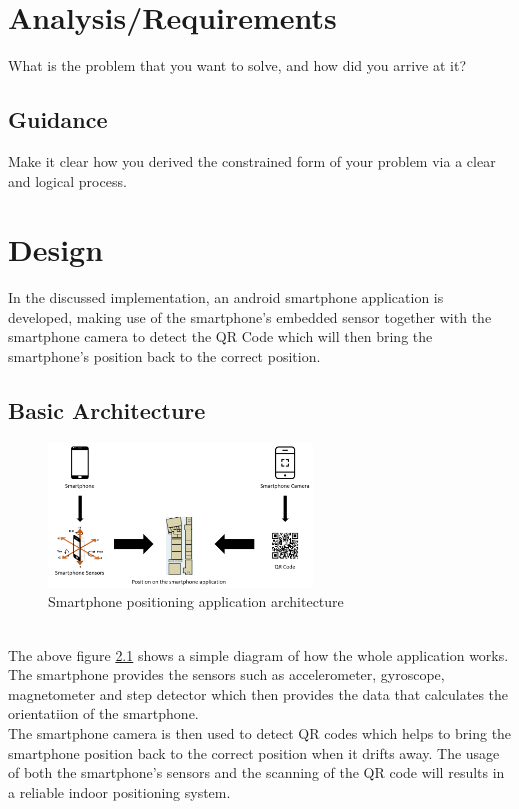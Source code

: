 \documentclass{l4proj}
\begin{document}
\chapter{Analysis/Requirements}
What is the problem that you want to solve, and how did you arrive at it?
\section{Guidance}
Make it clear how you derived the constrained form of your problem via a clear and logical process. 

\chapter{Design}
In the discussed implementation, an android smartphone application is developed, making use of the smartphone's embedded sensor together with the smartphone camera to detect the QR Code which will then bring the smartphone's position back to the correct position.
\section{Basic Architecture}
\begin{figure}[h]
    \centering
    \includegraphics[width=70mm]{images/architect}
    \caption{Smartphone positioning application architecture}
    \label{fig:architecture1}
\end{figure}\\

The above figure \ref{fig:architecture1} shows a simple diagram of how the whole application works. The smartphone provides the sensors such as accelerometer, gyroscope, magnetometer and step detector which then provides the data that calculates the orientatiion of the smartphone.\\
The smartphone camera is then used to detect QR codes which helps to bring the smartphone position back to the correct position when it drifts away.
The usage of both the smartphone's sensors and the scanning of the QR code will results in a reliable indoor positioning system.
\end{document}
